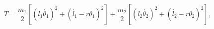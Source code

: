 \documentclass[preview, convert={outfile=\jobname.svg}]{standalone}
\begin{document}
\begin{equation*}
    T = \frac{m_1}{2}\left[\left(l_1\dot{\theta_1}\right)^2 + \left(\dot{l_1} - r\theta_1\right)^2\right] +
    \frac{m_2}{2}\left[\left(l_2\dot{\theta_2}\right)^2 + \left(\dot{l_2} - r\theta_2\right)^2\right],
\end{equation*}
\end{document}
